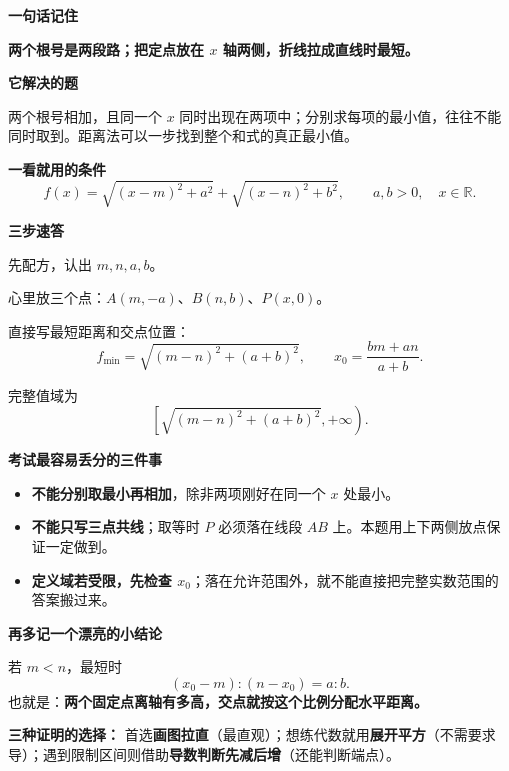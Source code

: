 \clearpage
\begin{summarybox}
\textbf{\textcolor{CSummary}{一句话记住}}

\textbf{两个根号是两段路；把定点放在 $x$ 轴两侧，折线拉成直线时最短。}

\medskip
\textbf{\textcolor{CSummary}{它解决的题}}

两个根号相加，且同一个 $x$ 同时出现在两项中；分别求每项的最小值，往往不能同时取到。距离法可以一步找到整个和式的真正最小值。

\medskip
\textbf{\textcolor{CSummary}{一看就用的条件}}
\[
 f(x)=\sqrt{(x-m)^2+a^2}+\sqrt{(x-n)^2+b^2},
 \qquad a,b>0,\quad x\in\mathbb R.
\]

\medskip
\textbf{\textcolor{CSummary}{三步速答}}
\begin{description}[style=nextline,leftmargin=2.3em,labelsep=.5em,itemsep=.4em]
\item[\textbf{第 1 步：}] 先配方，认出 $m,n,a,b$。
\item[\textbf{第 2 步：}] 心里放三个点：$A(m,-a)$、$B(n,b)$、$P(x,0)$。
\item[\textbf{第 3 步：}] 直接写最短距离和交点位置：
\[
 \boxed{f_{\min}=\sqrt{(m-n)^2+(a+b)^2}},\qquad
 \boxed{x_0=\frac{bm+an}{a+b}}.
\]
\end{description}

完整值域为
\[
 \boxed{\left[\sqrt{(m-n)^2+(a+b)^2},+\infty\right)}.
\]

\medskip
\textbf{\textcolor{CSummary}{考试最容易丢分的三件事}}
\begin{itemize}[leftmargin=*,itemsep=.4em]
\item \textbf{不能分别取最小再相加}，除非两项刚好在同一个 $x$ 处最小。
\item \textbf{不能只写三点共线}；取等时 $P$ 必须落在线段 $AB$ 上。本题用上下两侧放点保证一定做到。
\item \textbf{定义域若受限，先检查 $x_0$}；落在允许范围外，就不能直接把完整实数范围的答案搬过来。
\end{itemize}

\medskip
\textbf{\textcolor{CSummary}{再多记一个漂亮的小结论}}

若 $m<n$，最短时
\[
 \boxed{(x_0-m):(n-x_0)=a:b}.
\]
也就是：\textbf{两个固定点离轴有多高，交点就按这个比例分配水平距离。}

\textbf{三种证明的选择：} 首选\textbf{画图拉直}（最直观）；想练代数就用\textbf{展开平方}（不需要求导）；遇到限制区间则借助\textbf{导数判断先减后增}（还能判断端点）。
\end{summarybox}
